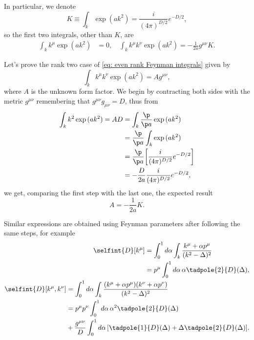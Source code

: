 In particular, we denote
\begin{equation}
    K \equiv \int_k\exp{(ak^2)} = \frac{i}{(4\pi)^{D/2}}e^{-D/2},
\end{equation}
so the first two integrals, other than $K$, are
\begin{align}
    \int_k k^\mu \exp{(ak^2)} &= 0,\quad 
    \int_k k^\mu k^\nu \exp{(ak^2)} = -\frac{1}{2a}g^{\mu\nu}K.
\end{align}
\begin{obs}
    Let's prove the rank two case of \eqref{eq: even rank Feynman integrals} given by
    \begin{equation}
        \int_k k^\mu k^\nu\exp{(ak^2)} = Ag^{\mu\nu},
    \end{equation}
    where $A$ is the unknown form factor. We begin by contracting both sides with the metric $g^{\mu\nu}$ remembering that $g^{\mu\nu}g_{\mu\nu} = D$, thus from
    \begin{equation}
        \begin{split}
            \int_k k^2\exp{(ak^2)} = AD &= \int_k\frac{\p}{\p a}\exp{(ak^2)} \\
            &= \frac{\p}{\p a}\int_k\exp{(ak^2)} \\
            &= \frac{\p}{\p a}\bigg[\frac{i}{(4\pi)^{D/2}}e^{-D/2}\bigg] \\
            &= -\frac{D}{2a}\frac{i}{(4\pi)^{D/2}}e^{-D/2},
        \end{split}
    \end{equation}
    we get, comparing the first step with the last one, the expected result
    \begin{equation}
        A = -\frac{1}{2a}K.
    \end{equation}
\end{obs}
Similar expressions are obtained using Feynman parameters after following the same steps, for example
\begin{align}
    \begin{split}
        \selfint{D}[k^\mu] &= \int_0^1 d\alpha\int_k \frac{k^\mu + \alpha p^\mu}{(k^2 - \Delta)^2} \\
        &= p^\mu\int_0^1 d\alpha\,\alpha\tadpole{2}{D}(\Delta),
    \end{split} \\
    \begin{split}
        \selfint{D}[k^\mu,k^\nu] &= \int_0^1 d\alpha\int_k \frac{(k^\mu + \alpha p^\mu)(k^\nu + \alpha p^\nu)}{(k^2 - \Delta)^2} \\
        &= p^\mu p^\nu\int_0^1 d\alpha\,\alpha^2\tadpole{2}{D}(\Delta) \\
        &+ \frac{g^{\mu\nu}}{D}\int_0^1 d\alpha\,[\tadpole{1}{D}(\Delta) + \Delta\tadpole{2}{D}(\Delta)].
    \end{split}
\end{align}

